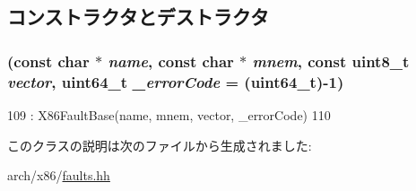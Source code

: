 \subsection{コンストラクタとデストラクタ}
\hypertarget{classX86ISA_1_1X86Fault_a19b766538cd8ae6fb9a7d9d79a08d009}{
\subsubsection[{X86Fault}]{ (const char $\ast$ {\em name}, \/  const char $\ast$ {\em mnem}, \/  const uint8\_\-t {\em vector}, \/  uint64\_\-t {\em \_\-errorCode} = {\ttfamily (uint64\_\-t)-\/1})}}
\label{classX86ISA_1_1X86Fault_a19b766538cd8ae6fb9a7d9d79a08d009}



\begin{DoxyCode}
109             : X86FaultBase(name, mnem, vector, _errorCode)
110         {}
\end{DoxyCode}


このクラスの説明は次のファイルから生成されました:\begin{DoxyCompactItemize}
\item 
arch/x86/\hyperlink{arch_2x86_2faults_8hh}{faults.hh}\end{DoxyCompactItemize}
